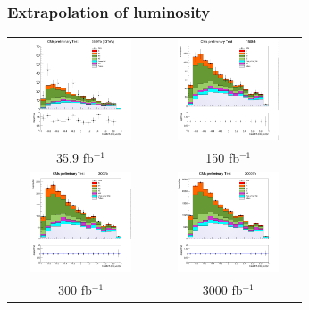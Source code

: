 \documentclass[11pt]{beamer}
\begin{document}
\begin{frame}
\frametitle{Extrapolation of luminosity }
\begin{center}
\begin{tabular}{cc}
\includegraphics[width=4cm,height=3cm]{figures/kin.png} &
\includegraphics[width=4cm,height=3cm]{figures/150fb/kin.png}\\ 
35.9 fb$^{-1}$ & 150 fb$^{-1}$ \\
\includegraphics[width=4cm,height=3cm]{figures/300fb/kin-300.png}&
\includegraphics[width=4cm,height=3cm]{figures/3000fb/kin-3000.png}\\
300 fb$^{-1}$ & 3000 fb$^{-1}$ \\
\end{tabular}
\end{center}
\end{frame}
\end{document}
